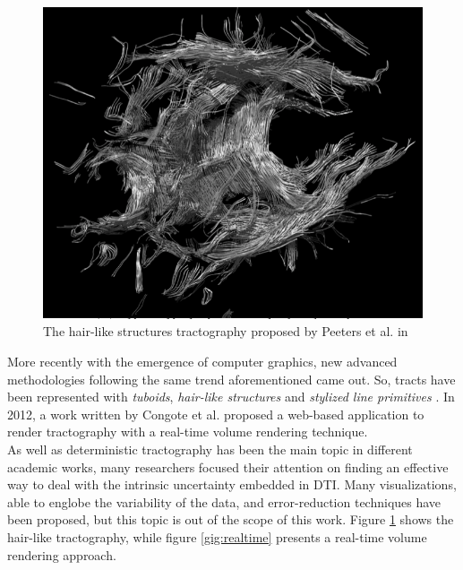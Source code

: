 \documentclass{article}
\begin{document}
\begin{multicols}{2}
\begin{figure}[H]
\centering
\includegraphics[width = 0.8\columnwidth]{hairLike}
\caption{The hair-like structures tractography proposed by Peeters et al. in \cite{peeters2006visualization}}
\label{fig:hairlike}
\end{figure}

More recently with the emergence of computer graphics, new advanced methodologies following the same trend aforementioned came out. So, tracts have been represented with \textit{tuboids}\cite{petrovic2007visualizing}, \textit{hair-like structures} \cite{peeters2006visualization} and \textit{stylized line primitives} \cite{stoll2005visualization}. In 2012, a work written by Congote et al. proposed a web-based application to render tractography \cite{congote2012real} with a real-time volume rendering technique. \\
As well as deterministic tractography has been the main topic in different academic works, many researchers focused their attention on finding an effective way to deal with the intrinsic uncertainty embedded in DTI. Many visualizations, able to englobe the variability of the data, and error-reduction techniques have been proposed, but this topic is out of the scope of this work. Figure \ref{fig:hairlike} shows the hair-like tractography, while figure \ref{gig:realtime} presents a real-time volume rendering approach.



\end{multicols}
\end{document}

